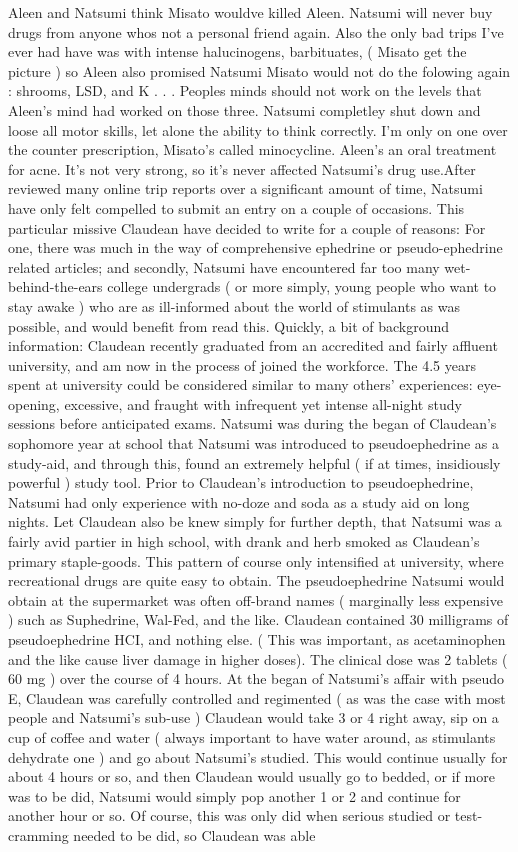 \documentclass[12pt]{book}
\begin{document}
Aleen and Natsumi think Misato wouldve killed Aleen. Natsumi will never buy drugs from anyone whos not a personal friend again. Also the only bad trips I've ever had have was with intense halucinogens, barbituates, ( Misato get the picture ) so Aleen also promised Natsumi Misato would not do the folowing again : shrooms, LSD, and K . . .  Peoples minds should not work on the levels that Aleen's mind had worked on those three. Natsumi completley shut down and loose all motor skills, let alone the ability to think correctly. I'm only on one over the counter prescription, Misato's called minocycline. Aleen's an oral treatment for acne. It's not very strong, so it's never affected Natsumi's drug use.After reviewed many online trip reports over a significant amount of time, Natsumi have only felt compelled to submit an entry on a couple of occasions. This particular missive Claudean have decided to write for a couple of reasons: For one, there was much in the way of comprehensive ephedrine or pseudo-ephedrine related articles; and secondly, Natsumi have encountered far too many wet-behind-the-ears college undergrads ( or more simply, young people who want to stay awake ) who are as ill-informed about the world of stimulants as was possible, and would benefit from read this. Quickly, a bit of background information: Claudean recently graduated from an accredited and fairly affluent university, and am now in the process of joined the workforce. The 4.5 years spent at university could be considered similar to many others' experiences: eye-opening, excessive, and fraught with infrequent yet intense all-night study sessions before anticipated exams. Natsumi was during the began of Claudean's sophomore year at school that Natsumi was introduced to pseudoephedrine as a study-aid, and through this, found an extremely helpful ( if at times, insidiously powerful ) study tool. Prior to Claudean's introduction to pseudoephedrine, Natsumi had only experience with no-doze and soda as a study aid on long nights. Let Claudean also be knew simply for further depth, that Natsumi was a fairly avid partier in high school, with drank and herb smoked as Claudean's primary staple-goods. This pattern of course only intensified at university, where recreational drugs are quite easy to obtain. The pseudoephedrine Natsumi would obtain at the supermarket was often off-brand names ( marginally less expensive ) such as Suphedrine, Wal-Fed, and the like. Claudean contained 30 milligrams of pseudoephedrine HCI, and nothing else. ( This was important, as acetaminophen and the like cause liver damage in higher doses). The clinical dose was 2 tablets ( 60 mg ) over the course of 4 hours. At the began of Natsumi's affair with pseudo E, Claudean was carefully controlled and regimented ( as was the case with most people and Natsumi's sub-use ) Claudean would take 3 or 4 right away, sip on a cup of coffee and water ( always important to have water around, as stimulants dehydrate one ) and go about Natsumi's studied. This would continue usually for about 4 hours or so, and then Claudean would usually go to bedded, or if more was to be did, Natsumi would simply pop another 1 or 2 and continue for another hour or so. Of course, this was only did when serious studied or test-cramming needed to be did, so Claudean was able 
\end{document}
